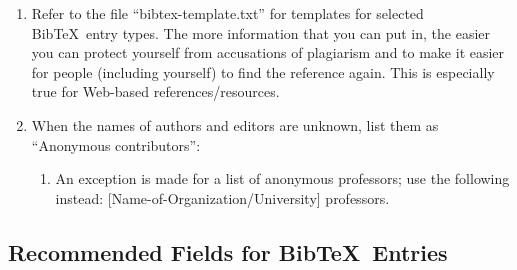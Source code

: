 \documentclass[letter,12pt]{article}
\begin{document}
\begin{enumerate}
\begin{enumerate}
	\end{enumerate}
\item Refer to the file ``bibtex-template.txt'' for templates for selected {\sc Bib}\TeX\ entry types. The more information that you can put in, the easier you can protect yourself from accusations of plagiarism and to make it easier for people (including yourself) to find the reference again. This is especially true for Web-based references/resources.
\item When the names of authors and editors are unknown, list them as ``Anonymous contributors'': \vspace{-0.3cm}
	\begin{enumerate} \itemsep -2pt
	\item An exception is made for a list of anonymous professors; use the following instead: [Name-of-Organization/University] professors.
	\end{enumerate}
\end{enumerate}



\subsection{Recommended Fields for {\sc Bib}\TeX\ Entries}
\label{ssec:RecommendedFieldsforBibTeXEntries}
\end{document}
